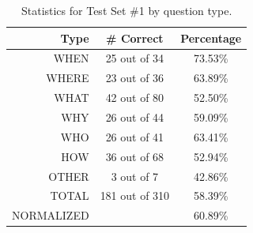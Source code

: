 \documentclass[11pt,letterpaper]{article}
\begin{document}
\begin{table}
\centering

	\begin{tabular}{|r|c|c|}
	\hline
	Type   & \# Correct & Percentage \\
	\hline
	\hline
	WHEN   &  25 out of  34 &  73.53\% \\
	\hline
	WHERE  &  23 out of  36 &  63.89\% \\
	\hline
	WHAT   &  42 out of  80 &  52.50\% \\
	\hline
	WHY    &  26 out of  44 &  59.09\% \\
	\hline
	WHO    &  26 out of  41 &  63.41\% \\
	\hline
	HOW    &  36 out of  68 &  52.94\% \\
	\hline
	OTHER  &   3 out of   7 &  42.86\% \\
	\hline
	\hline
	TOTAL  & 181 out of 310 &  58.39\% \\
	\tiny{NORMALIZED}  &  &  60.89\% \\
	\hline
	\end{tabular}

\caption{Statistics for Test Set \#1 by question type.}
\label{table:question-types1}
\end{table}


%
\end{document}
